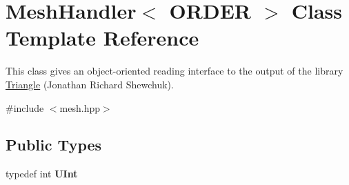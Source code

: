 \hypertarget{classMeshHandler}{
\section{MeshHandler$<$ ORDER $>$ Class Template Reference}
\label{classMeshHandler}
}


This class gives an object-\/oriented reading interface to the output of the library \hyperlink{classTriangle}{Triangle} (Jonathan Richard Shewchuk).  


{\ttfamily \#include $<$mesh.hpp$>$}\subsection*{Public Types}
\begin{DoxyCompactItemize}
\item 
\hypertarget{classMeshHandler_ad644d0751db0969df9a4255750056f8f}{
typedef int {\bfseries UInt}}
\label{classMeshHandler_ad644d0751db0969df9a4255750056f8f}

\end{DoxyCompactItemize}

